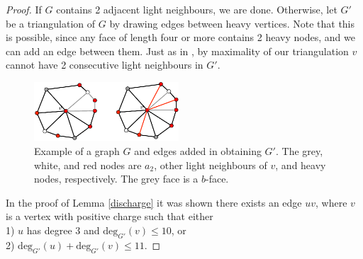 \documentclass{article}
\newcommand{\0}{\mathbb{0}}
\newcommand{\1}{\mathbb{1}}
\begin{document}
\begin{proof}
 If $G$ contains  2 adjacent light neighbours, we are done. Otherwise, let $G'$ be a triangulation of $G$ by drawing edges between heavy vertices. Note that this is possible, since any face of length four or more contains 2 heavy nodes, and we can add an edge between them.  Just as in \cite{JV13}, by maximality of our triangulation $v$ cannot have 2 consecutive light neighbours in $G'$.

\begin{figure}[h]
  \begin{center}
        \includegraphics[width=0.48\textwidth]{UntriangulatedAndTriangulatedDual.pdf}
  \caption{\label{Triangulating} Example of a graph $G$ and edges added in obtaining $G'$. The grey, white, and red nodes are $a_2$, other light neighbours of $v$, and heavy nodes, respectively. The grey face is a $b$-face. } 
  \end{center}
\end{figure}

 In the proof of Lemma \ref{discharge} it was shown there exists an edge $uv$, where $v$ is a vertex with positive charge such that either \\
 1) $u$ has degree 3 and $\text{deg}_{G'}(v) \leq 10$, or \\
 2) $\text{deg}_{G'}(u)+ \text{deg}_{G'}(v) \leq 11$.


\end{proof}
\end{document}
